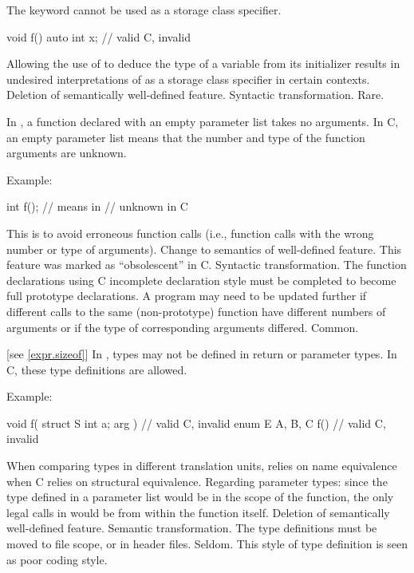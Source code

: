 \change
The keyword  cannot be used as a storage class specifier.

\begin{codeblock}
void f() {
  auto int x;     // valid C, invalid \Cpp{}
}
\end{codeblock}

\rationale Allowing the use of  to deduce the type
of a variable from its initializer results in undesired interpretations of
 as a storage class specifier in certain contexts.
\effect Deletion of semantically well-defined feature.
\difficulty Syntactic transformation.
\howwide Rare.

\change In \Cpp{}, a function declared with an empty parameter list takes no arguments.
In C, an empty parameter list means that the number and type of the function arguments are unknown.

Example:

\begin{codeblock}
int f();            // means    in \Cpp{}
                    //  unknown \tcode{)} in C
\end{codeblock}

\rationale
This is to avoid erroneous function calls (i.e., function calls
with the wrong number or type of arguments).
\effect
Change to semantics of well-defined feature.
This feature was marked as ``obsolescent'' in C.
\difficulty
Syntactic transformation.
The function declarations using C incomplete declaration style must
be completed to become full prototype declarations.
A program may need to be updated further if different calls to the
same (non-prototype) function have different numbers of arguments or
if the type of corresponding arguments differed.
\howwide
Common.

 [see \ref{expr.sizeof}]
\change In \Cpp{}, types may not be defined in return or parameter types.
In C, these type definitions are allowed.

Example:

\begin{codeblock}
void f( struct S { int a; } arg ) {}    // valid C, invalid \Cpp{}
enum E { A, B, C } f() {}               // valid C, invalid \Cpp{}
\end{codeblock}

\rationale
When comparing types in different translation units, \Cpp{} relies
on name equivalence when C relies on structural equivalence.
Regarding parameter types: since the type defined in a parameter list
would be in the scope of the function, the only legal calls in \Cpp{}
would be from within the function itself.
\effect
Deletion of semantically well-defined feature.
\difficulty
Semantic transformation.
The type definitions must be moved to file scope, or in header files.
\howwide
Seldom.
This style of type definition is seen as poor coding style.

